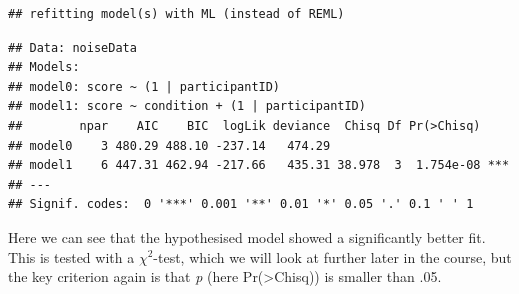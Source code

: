 \documentclass[
]{book}
\newenvironment{Shaded}{\begin{snugshade}}{\end{snugshade}}
\newcommand{\CommentTok}[1]{\textcolor[rgb]{0.56,0.35,0.01}{\textit{#1}}}
\newcommand{\DataTypeTok}[1]{\textcolor[rgb]{0.13,0.29,0.53}{#1}}
\newcommand{\DecValTok}[1]{\textcolor[rgb]{0.00,0.00,0.81}{#1}}
\newcommand{\KeywordTok}[1]{\textcolor[rgb]{0.13,0.29,0.53}{\textbf{#1}}}
\newcommand{\NormalTok}[1]{#1}
\newcommand{\OperatorTok}[1]{\textcolor[rgb]{0.81,0.36,0.00}{\textbf{#1}}}
\newcommand{\StringTok}[1]{\textcolor[rgb]{0.31,0.60,0.02}{#1}}
\begin{document}
\begin{Shaded}
\end{Shaded}

\begin{verbatim}
## refitting model(s) with ML (instead of REML)
\end{verbatim}

\begin{verbatim}
## Data: noiseData
## Models:
## model0: score ~ (1 | participantID)
## model1: score ~ condition + (1 | participantID)
##        npar    AIC    BIC  logLik deviance  Chisq Df Pr(>Chisq)    
## model0    3 480.29 488.10 -237.14   474.29                         
## model1    6 447.31 462.94 -217.66   435.31 38.978  3  1.754e-08 ***
## ---
## Signif. codes:  0 '***' 0.001 '**' 0.01 '*' 0.05 '.' 0.1 ' ' 1
\end{verbatim}

Here we can see that the hypothesised model showed a significantly better fit. This is tested with a \(\chi^2\)-test, which we will look at further later in the course, but the key criterion again is that \emph{p} (here Pr(\textgreater Chisq)) is smaller than .05.
\end{document}

